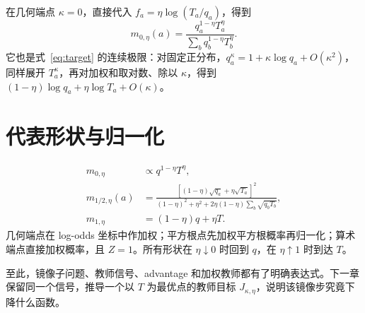 在几何端点 $\kappa=0$，直接代入 $f_a=\eta\log(T_a/q_a)$，得到
\begin{equation}
m_{0,\eta}(a)
=\frac{q_a^{1-\eta}T_a^\eta}{\sum_bq_b^{1-\eta}T_b^\eta}.
\end{equation}
它也是式~\eqref{eq:target} 的连续极限：对固定正分布，$q_a^\kappa=1+\kappa\log q_a+O(\kappa^2)$，同样展开 $T_a^\kappa$，再对加权和取对数、除以 $\kappa$，得到 $(1-\eta)\log q_a+\eta\log T_a+O(\kappa)$。

\section{代表形状与归一化}
\begin{equation}
\begin{aligned}
m_{0,\eta}&\propto q^{1-\eta}T^\eta,\\
m_{1/2,\eta}(a)&=
\frac{[(1-\eta)\sqrt{q_a}+\eta\sqrt{T_a}]^2}
{(1-\eta)^2+\eta^2+2\eta(1-\eta)\sum_b\sqrt{q_bT_b}},\\
m_{1,\eta}&=(1-\eta)q+\eta T.
\end{aligned}
\label{eq:three-targets}
\end{equation}
几何端点在 log-odds 坐标中作加权；平方根点先加权平方根概率再归一化；算术端点直接加权概率，且 $Z=1$。所有形状在 $\eta\downarrow0$ 时回到 $q$，在 $\eta\uparrow1$ 时到达 $T$。

至此，镜像子问题、教师信号、advantage 和加权教师都有了明确表达式。下一章保留同一个信号，推导一个以 $T$ 为最优点的教师目标 $J_{\kappa,\eta}$，说明该镜像步究竟下降什么函数。
